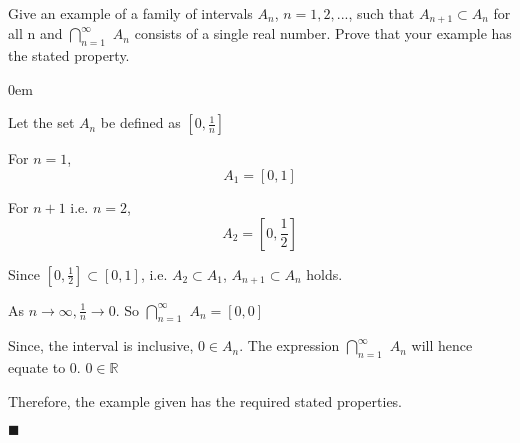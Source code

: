 \documentclass[12pt]{article}
\newcommand{\R}{\mathbb{R}}
\renewcommand{\qed}{\hfill$\blacksquare$}
\renewenvironment{proof}{\begin{addmargin}[1em]{0em}\begin{newproof}}{\end{newproof}\end{addmargin}\qed}
\newenvironment{problem}[2][Problem]{\begin{trivlist}
\item[\hskip \labelsep {\bfseries #1}\hskip \labelsep {\bfseries #2.}]}{\end{trivlist}}
\begin{document}
\pagebreak


\begin{problem}{10}
    Give an example of a family of intervals $A_n$, $n = 1,2,...$, such that $A_{n+1} \subset A_n$ for all n and ${\bigcap\limits}_{n=1}^{\infty}$ $A_n$ consists of a single real number. Prove that your example has the stated property.
\end{problem}

\begin{proof}
Let the set $A_n$ be defined as $[0, \frac{1}{n}]$

For $n=1$,
$$
A_1 = [0,1]
$$

For $n+1$ i.e. $n=2$,
$$
A_2 = [0,\frac{1}{2}]
$$

Since $[0,\frac{1}{2}] \subset [0,1]$, i.e. $A_2 \subset A_1$, $A_{n+1} \subset A_n$ holds.

\hfill \break
As $n\to\infty, \frac{1}{n}\to0$. So ${\bigcap\limits}_{n=1}^{\infty}$ $A_n = [0,0]$

Since, the interval is inclusive, $0 \in A_n$. The expression ${\bigcap\limits}_{n=1}^{\infty}$ $A_n$ will hence equate to 0. $0\in\R$

\hfill \break
Therefore, the example given has the required stated properties.
\end{proof}

\pagebreak

 
\end{document}
